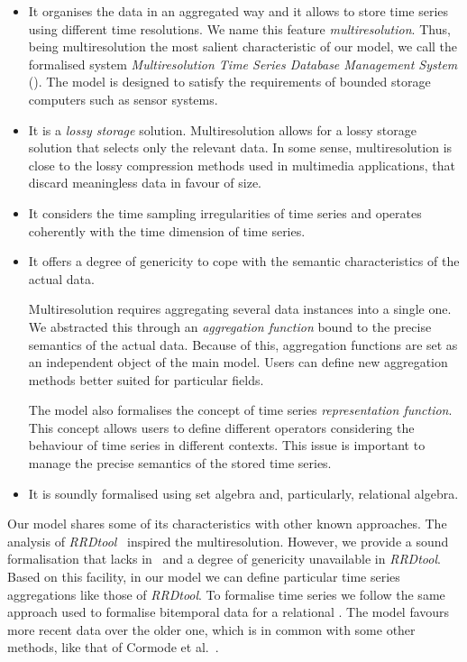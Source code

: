 \begin{itemize}

\item It organises the data in an aggregated way and it allows to
  store time series using different time resolutions. We name this
  feature \emph{multiresolution}.  Thus, being multiresolution the
  most salient characteristic of our model, we call the formalised
  system \emph{Multiresolution Time Series Database Management System}
  ().  The model is designed to satisfy the requirements
  of bounded storage computers such as sensor systems.

\item It is a \emph{lossy storage} solution. Multiresolution allows
  for a lossy storage solution that selects only the relevant data. In
  some sense, multiresolution is close to the lossy compression
  methods used in multimedia applications, that discard meaningless
  data in favour of size.

\item It considers the time sampling irregularities of time series and
  operates coherently with the time dimension of time series.

\item It offers a degree of genericity to cope with the semantic
  characteristics of the actual data.

  Multiresolution requires aggregating several data instances into a
  single one. We abstracted this through an \emph{aggregation
    function} bound to the precise semantics of the actual
  data. Because of this, aggregation functions are set as an
  independent object of the main model.  Users can define new
  aggregation methods better suited for particular fields.

  The model also formalises the concept of time series
  \emph{representation function}.  This concept allows users to define
  different operators considering the behaviour of time series in
  different contexts. This issue is important to manage the precise
  semantics of the stored time series.

\item It is soundly formalised using set algebra and, particularly,
  relational algebra.

\end{itemize}

Our model shares some of its characteristics with other known
approaches. The analysis of \emph{RRDtool}~\cite{rrdtool} inspired the
multiresolution. However, we provide a sound formalisation that lacks
in~\cite{rrdtool} and a degree of genericity unavailable in
\emph{RRDtool}. Based on this facility, in our model we can define
particular time series aggregations like those of \emph{RRDtool}. To
formalise time series we follow the same approach used to formalise
bitemporal data for a relational . The model favours more
recent data over the older one, which is in common with some other
methods, like that of Cormode et al.~\cite{cormode08:pods}.

